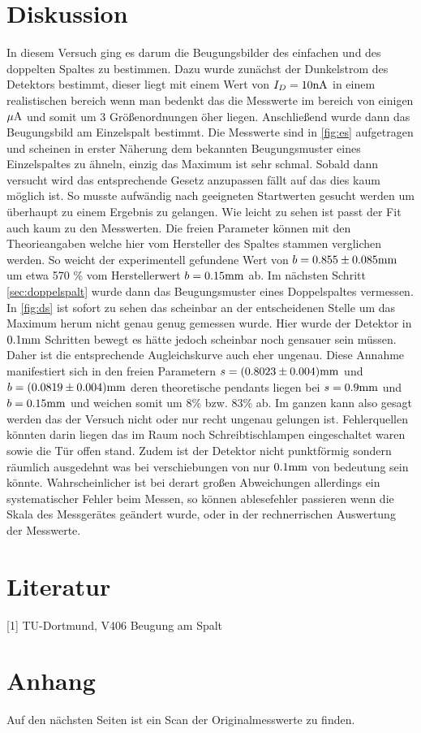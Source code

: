 \section{Diskussion}
\label{sec:diskussion}
In diesem Versuch ging es darum die Beugungsbilder des einfachen und des doppelten Spaltes zu bestimmen.
Dazu wurde zunächst der Dunkelstrom des Detektors bestimmt, dieser liegt mit einem Wert von $I_D=10\si[]{nA}$
in einem realistischen bereich wenn man bedenkt das die Messwerte im bereich von einigen $\si[]{\mu A}$ und somit um
3 Größenordnungen öher liegen. Anschließend wurde dann das Beugungsbild am Einzelspalt bestimmt. Die Messwerte
sind in \autoref{fig:es} aufgetragen und scheinen in erster Näherung dem bekannten Beugungsmuster eines Einzelspaltes
zu ähneln, einzig das Maximum ist sehr schmal. Sobald dann versucht wird das entsprechende Gesetz anzupassen 
fällt auf das dies kaum möglich ist. So musste aufwändig nach geeigneten Startwerten gesucht werden um überhaupt zu
einem Ergebnis zu gelangen. Wie leicht zu sehen ist passt der Fit auch kaum zu den Messwerten. Die freien Parameter
können mit den Theorieangaben welche hier vom Hersteller des Spaltes stammen verglichen werden. So weicht
der experimentell gefundene Wert von $b=0.855\pm 0.085\si[]{mm}$ um etwa 570 \% vom Herstellerwert $b=0.15\si[]{mm}$
ab. Im nächsten Schritt \autoref{sec:doppelspalt} wurde dann das Beugungsmuster eines Doppelspaltes vermessen. 
In \autoref{fig:ds} ist sofort zu sehen das scheinbar an der entscheidenen Stelle um das Maximum herum nicht genau
genug gemessen wurde. Hier wurde der Detektor in $0.1\si[]{mm}$ Schritten bewegt es hätte jedoch scheinbar noch gensauer
sein müssen. Daher ist die entsprechende Augleichskurve auch eher ungenau. Diese Annahme manifestiert sich 
in den freien Parametern $s=(0.8023\pm 0.004)\si[]{mm}$ und $b=(0.0819\pm 0.004)\si[]{mm}$ deren theoretische pendants
liegen bei $s=0.9\si[]{mm}$ und $b=0.15\si[]{mm}$ und weichen somit um 8\% bzw. 83\% ab. Im ganzen kann 
also gesagt werden das der Versuch nicht oder nur recht ungenau gelungen ist. Fehlerquellen könnten darin liegen das
im Raum noch Schreibtischlampen eingeschaltet waren sowie die Tür offen stand. Zudem ist der Detektor nicht 
punktförmig sondern räumlich ausgedehnt was bei verschiebungen von nur $0.1\si[]{mm}$ von bedeutung sein könnte.
Wahrscheinlicher ist bei derart großen Abweichungen allerdings ein systematischer Fehler beim Messen, so können 
ablesefehler passieren wenn die Skala des Messgerätes geändert wurde, oder in der rechnerrischen Auswertung der
Messwerte.

\section{Literatur}
\label{sec:literatur}
[1] TU-Dortmund, V406 Beugung am Spalt

\section{Anhang}
\label{sec:Anhang}
Auf den nächsten Seiten ist ein Scan der Originalmesswerte zu finden.